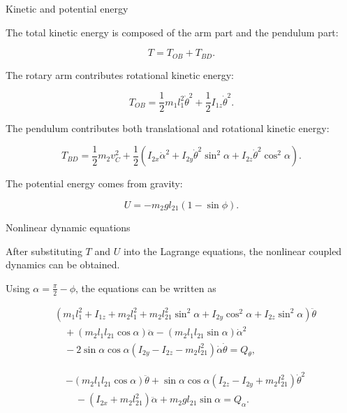 \documentclass[aspectratio=169]{beamer}
\begin{document}
\begin{frame}{Kinetic and potential energy}

The total kinetic energy is composed of the arm part and the pendulum part:

\[
T = T_{OB}+T_{BD}.
\]

\vspace{0.2cm}

The rotary arm contributes rotational kinetic energy:

\[
T_{OB}
=
\frac{1}{2}m_1 l_1^2 \dot{\theta}^2
+
\frac{1}{2}I_{1z}\dot{\theta}^2 .
\]

\vspace{0.2cm}

The pendulum contributes both translational and rotational kinetic energy:

\[
T_{BD}
=
\frac{1}{2}m_2 v_C^2
+
\frac{1}{2}
\left(
I_{2x}\dot{\alpha}^2
+
I_{2y}\dot{\theta}^2\sin^2\alpha
+
I_{2z}\dot{\theta}^2\cos^2\alpha
\right).
\]

\vspace{0.2cm}

The potential energy comes from gravity:

\[
U = -m_2 g l_{21}(1-\sin\phi).
\]

\end{frame}



\begin{frame}{Nonlinear dynamic equations}

After substituting $T$ and $U$ into the Lagrange equations, the nonlinear coupled dynamics can be obtained.

\vspace{0.2cm}

Using $\alpha=\frac{\pi}{2}-\phi$, the equations can be written as

\[
\begin{aligned}
&
\left(
m_1l_1^2+I_{1z}+m_2l_1^2+m_2l_{21}^2\sin^2\alpha
+I_{2y}\cos^2\alpha+I_{2z}\sin^2\alpha
\right)\ddot{\theta}
\\
&\quad
+
(m_2l_1l_{21}\cos\alpha)\ddot{\alpha}
-
(m_2l_1l_{21}\sin\alpha)\dot{\alpha}^2
\\
&\quad
-
2\sin\alpha\cos\alpha
\left(
I_{2y}-I_{2z}-m_2l_{21}^2
\right)
\dot{\alpha}\dot{\theta}
=
Q_{\theta},
\end{aligned}
\]

\[
\begin{aligned}
&
-(m_2l_1l_{21}\cos\alpha)\ddot{\theta}
+
\sin\alpha\cos\alpha
\left(
I_{2z}-I_{2y}+m_2l_{21}^2
\right)\dot{\theta}^2
\\
&\quad
-
(I_{2x}+m_2l_{21}^2)\ddot{\alpha}
+
m_2gl_{21}\sin\alpha
=
Q_{\alpha}.
\end{aligned}
\]

\end{frame}
\end{document}
